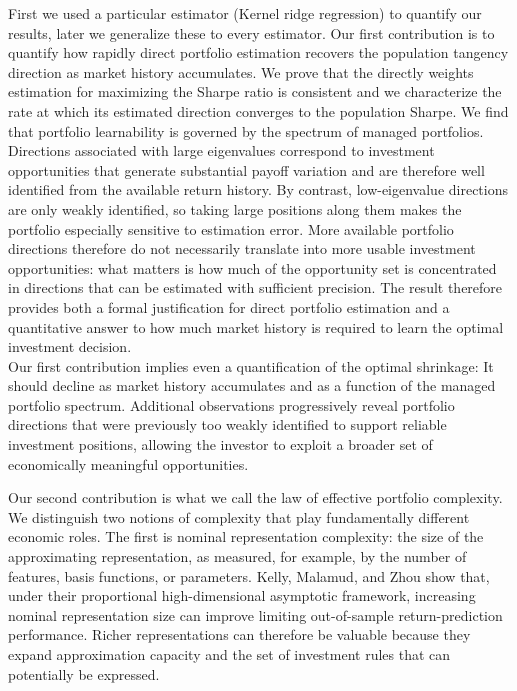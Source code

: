 First we used a particular estimator (Kernel ridge regression) to quantify our results, later we generalize these to every estimator.
Our first contribution is to quantify how rapidly direct portfolio estimation recovers the population tangency direction as market history accumulates.
We prove that the directly weights estimation for maximizing the Sharpe ratio is consistent and we characterize the rate at which its estimated direction converges to the population Sharpe.
We find that portfolio learnability is governed by the spectrum of managed portfolios. Directions associated with large eigenvalues correspond to investment opportunities that generate substantial payoff variation and are therefore well identified from the available return history. By contrast, low-eigenvalue directions are only weakly identified, so taking large positions along them makes the portfolio especially sensitive to estimation error. More available portfolio directions therefore do not necessarily translate into more usable investment opportunities: what matters is how much of the opportunity set is concentrated in directions that can be estimated with sufficient precision.
The result therefore provides
both a formal justification for direct portfolio estimation and a quantitative
answer to how much market history is required to learn the optimal investment
decision. \\
Our first contribution implies even a quantification of the optimal shrinkage: It should decline as market history accumulates and as a function of the managed portfolio spectrum. Additional observations progressively reveal portfolio directions that were previously too weakly identified to support reliable investment positions, allowing the investor to exploit a broader set of economically meaningful opportunities.



Our second contribution is what we call the law of effective portfolio complexity. We distinguish two notions of complexity that play fundamentally different economic roles. The first is nominal representation complexity: the size of the approximating representation, as measured, for example, by the number of features, basis functions, or parameters. Kelly, Malamud, and Zhou show that, under their proportional high-dimensional asymptotic framework, increasing nominal representation size can improve limiting out-of-sample return-prediction performance. Richer representations can therefore be valuable because they expand approximation capacity and the set of investment rules that can potentially be expressed.


